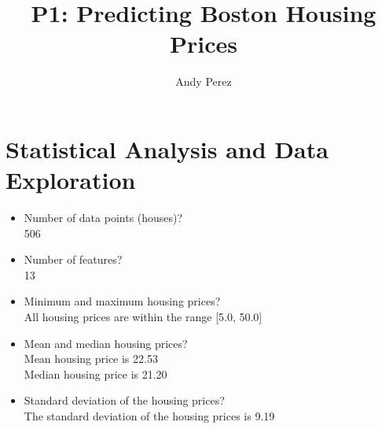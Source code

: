 \documentclass{amsart}
\begin{document}
\title{P1: Predicting Boston Housing Prices}
\author{Andy Perez}
\maketitle
\section{Statistical Analysis and Data Exploration}
\begin{itemize}
	\item Number of data points (houses)? \vspace{1mm} \\
		506\vspace{1mm}
	\item Number of features? \vspace{1mm} \\
		13\vspace{1mm}
	\item Minimum and maximum housing prices? \vspace{1mm}\\
		All housing prices are within the range [5.0, 50.0]\vspace{1mm}
	\item Mean and median housing prices? \vspace{1mm}\\
		Mean housing price is 22.53 \vspace{1mm}\\
		Median housing price is 21.20\vspace{1mm}
	\item Standard deviation of the housing prices? \vspace{1mm}\\
		The standard deviation of the housing prices is 9.19\vspace{1mm}
\end{itemize}
\end{document}

